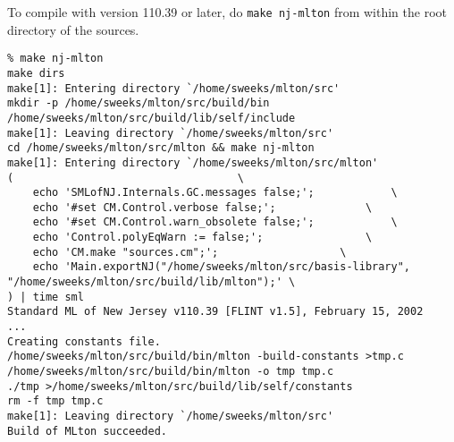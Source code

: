 To compile with {\smlnj} version 110.39 or later, do {\tt make nj-mlton} from
within the root directory of the sources.
\begin{verbatim}
% make nj-mlton
make dirs
make[1]: Entering directory `/home/sweeks/mlton/src'
mkdir -p /home/sweeks/mlton/src/build/bin /home/sweeks/mlton/src/build/lib/self/include
make[1]: Leaving directory `/home/sweeks/mlton/src'
cd /home/sweeks/mlton/src/mlton && make nj-mlton
make[1]: Entering directory `/home/sweeks/mlton/src/mlton'
(									\
	echo 'SMLofNJ.Internals.GC.messages false;';			\
	echo '#set CM.Control.verbose false;';				\
	echo '#set CM.Control.warn_obsolete false;';			\
	echo 'Control.polyEqWarn := false;';				\
	echo 'CM.make "sources.cm";';					\
	echo 'Main.exportNJ("/home/sweeks/mlton/src/basis-library", "/home/sweeks/mlton/src/build/lib/mlton");'	\
) | time sml
Standard ML of New Jersey v110.39 [FLINT v1.5], February 15, 2002
...
Creating constants file.
/home/sweeks/mlton/src/build/bin/mlton -build-constants >tmp.c
/home/sweeks/mlton/src/build/bin/mlton -o tmp tmp.c
./tmp >/home/sweeks/mlton/src/build/lib/self/constants
rm -f tmp tmp.c
make[1]: Leaving directory `/home/sweeks/mlton/src'
Build of MLton succeeded.
\end{verbatim}
